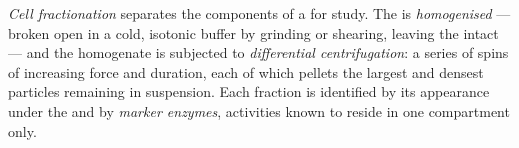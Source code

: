 \begin{definition}\label{def:b1:cell-unit-of-life:fractionation}
\emph{Cell fractionation} separates the
components of a  for study. The  is
\emph{homogenised} ---  broken open in a cold,
isotonic buffer by grinding or shearing, leaving the  intact
--- and the homogenate is subjected to \emph{differential
centrifugation}: a series of spins
of increasing force and duration, each of which pellets the largest
and densest particles remaining in suspension. Each fraction is
identified by its appearance under the  and by
\emph{marker enzymes}, activities known to reside in
one compartment only.
\end{definition}

